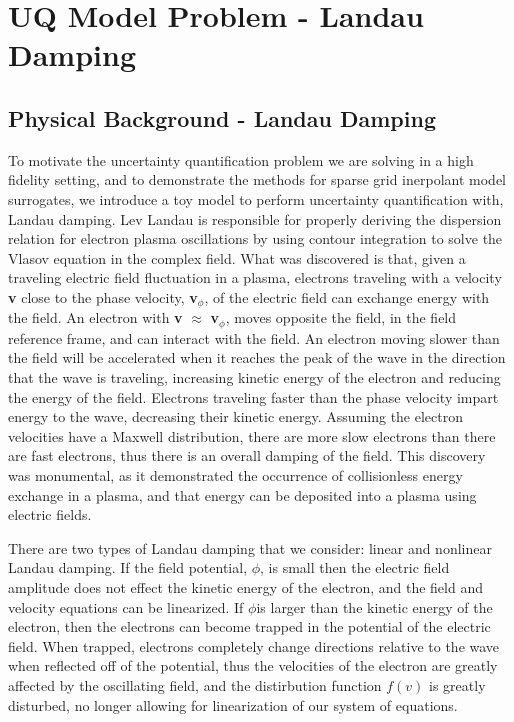 \documentclass{article}
\begin{document}
\section{UQ Model Problem - Landau Damping}
\subsection{Physical Background - Landau Damping}
To motivate the uncertainty quantification problem we are solving in a high fidelity setting, and to demonstrate the methods for sparse grid inerpolant model surrogates, we introduce a toy model to perform uncertainty quantification with, Landau damping. Lev Landau is responsible for properly deriving the dispersion relation for electron plasma oscillations by using contour integration to solve the Vlasov equation in the complex field. What was discovered is that, given a traveling electric field fluctuation in a plasma, electrons traveling with a velocity \textbf{v} close to the phase velocity, \textbf{v}$_{\phi}$, of the electric field can exchange energy with the field. An electron with \textbf{v}  $\approx$ \textbf{ v}$_{\phi}$, moves opposite the field, in the field reference frame, and can interact with the field. An electron moving slower than the field will be accelerated when it reaches the peak of the wave in the direction that the wave is traveling, increasing kinetic energy of the electron and reducing the energy of the field. Electrons traveling faster than the phase velocity impart energy to the wave, decreasing their kinetic energy. Assuming the electron velocities have a Maxwell distribution, there are more slow electrons than there are fast electrons, thus there is an overall damping of the field. This discovery was monumental, as it demonstrated the occurrence of collisionless energy exchange in a plasma, and that energy can be deposited into a plasma using electric fields.\\

\vspace{0.01cm}

There are two types of Landau damping that we consider: linear and nonlinear Landau damping. If the field potential, $\phi$, is small then the electric field amplitude does not effect the kinetic energy of the electron, and the field and velocity equations can be linearized. If $\phi$is larger than the kinetic energy of the electron, then the electrons can become trapped in the potential of the electric field. When trapped, electrons completely change directions relative to the wave when reflected off of the potential, thus the velocities of the electron are greatly affected by the oscillating field, and the distirbution function $f(v)$ is greatly disturbed, no longer allowing for linearization of our system of equations. \\
\end{document}
